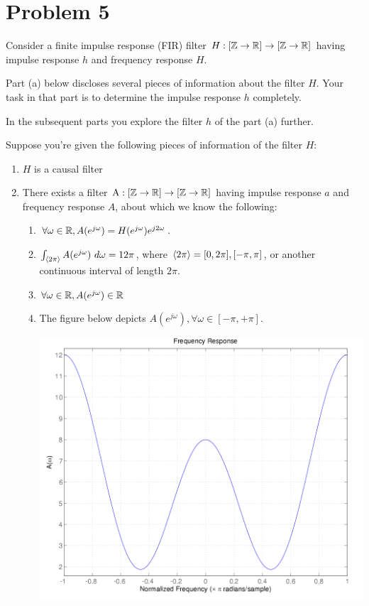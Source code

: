 \documentclass[10pt]{article}
\begin{document}
	\section*{Problem 5} 
	Consider a finite impulse response (FIR) filter \( H : [\mathbb Z \to \mathbb R] \to [\mathbb Z \to \mathbb R]\) having impulse 
	response \( h \) and frequency response \( H \). 

	Part (a) below discloses several pieces of information about the filter \( H \). Your task in that part 
	is to determine the impulse response \( h \) completely. 

	In the subsequent parts you explore the filter \( h \) of the part (a) further. 

	Suppose you're given the following pieces of information of the filter \( H \):
	\begin{enumerate}[label=\Roman*)]
		\item \( H \) is a causal filter
		\item There exists a filter \( \text{A}: [\mathbb Z \to \mathbb R] \to [\mathbb Z \to \mathbb R] \) having impulse response \( a \) and 
			frequency response \( A \), about which we know the following:
			\begin{enumerate}[label=\roman*)]
				\item \( \forall \omega \in \mathbb R, A(e^{j \omega}) = H(e^{j \omega}) e^{j 2 \omega} \).
				\item \( \int_{\langle 2\pi \rangle} A(e^{ j \omega}) \ d \omega = 12\pi \), where 
					\( \langle 2\pi \rangle = [0, 2\pi], [-\pi, \pi] \), or another continuous interval of length 
					\( 2\pi \). 
				\item \( \forall \omega \in \mathbb R, A(e^{j \omega}) \in \mathbb R\)
				\item The figure below depicts \( A(e^{j \omega}), \forall \omega \in [-\pi, +\pi] \). 
					\begin{center}
						\includegraphics[scale=0.65]{q5.png}
					\end{center}
			\end{enumerate}
	\end{enumerate}
\end{document}
